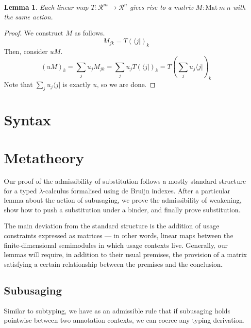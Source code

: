 \documentclass[submission,copyright,creativecommons]{eptcs}
\newtheorem{lemma}[theorem]{Lemma}
\begin{document}
\begin{lemma}
  Each linear map $T : \mathscr R^m \to \mathscr R^n$ gives rise to a matrix
  $M : \mathrm{Mat}~m~n$ with the same action.
\end{lemma}
\begin{proof}
  We construct $M$ as follows.
  \[
    M_{jk} = T(\langle j \rvert)_k
  \]
  Then, consider $uM$.
  \[
    (uM)_k = \sum_j u_jM_{jk} = \sum_j u_jT\left(\langle j \rvert\right)_k
    = T\left(\sum_j u_j\langle j \rvert\right)_k
  \]
  Note that $\sum_j u_j\langle j \rvert$ is exactly $u$, so we are done.
\end{proof}

\section{Syntax}

\section{Metatheory}

Our proof of the admissibility of substitution follows a mostly standard
structure for a typed $\lambda$-calculus formalised using de Bruijn indexes.
After a particular lemma about the action of subusaging, we prove the
admissibility of weakening, show how to push a substitution under a binder, and
finally prove substitution.

The main deviation from the standard structure is the addition of usage
constraints expressed as matrices --- in other words, linear maps between the
finite-dimensional semimodules in which usage contexts live.
Generally, our lemmas will require, in addition to their usual premises, the
provision of a matrix satisfying a certain relationship between the premises and
the conclusion.

\subsection{Subusaging}

Similar to subtyping, we have as an admissible rule that if subusaging holds
pointwise between two annotation contexts, we can coerce any typing derivation.
\end{document}
